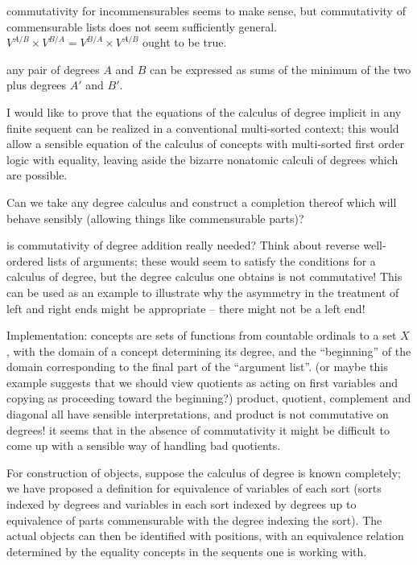 \documentclass{article}
\begin{document}
commutativity for incommensurables seems to make sense, but
commutativity of commensurable lists does not seem sufficiently
general.  $V^{A/B} \times V^{B/A} = V^{B/A}\times V^{A/B}$ ought to be
true.

any pair of degrees $A$ and $B$ can be expressed as sums of the
minimum of the two plus degrees $A'$ and $B'$.

I would like to prove that the equations of the calculus of degree
implicit in any finite sequent can be realized in a conventional
multi-sorted context; this would allow a sensible equation of the
calculus of concepts with multi-sorted first order logic with
equality, leaving aside the bizarre nonatomic calculi of degrees which
are possible.

Can we take any degree calculus and construct a completion thereof which 
will behave sensibly (allowing things like commensurable parts)?

is commutativity of degree addition really needed?  Think about reverse
well-ordered lists of arguments; these would seem to satisfy the 
conditions for a calculus of degree, but the degree calculus one
obtains is not commutative!  This can be used as an example to illustrate
why the asymmetry in the treatment of left and right ends might be
appropriate -- there might not be a left end!

Implementation:  concepts are sets of functions from countable
ordinals to a set $X$, with the domain of a concept determining its
degree, and the ``beginning'' of the domain corresponding to the
final part of the ``argument list''. (or maybe this example suggests
that we should view quotients as acting on first variables and copying
as proceeding toward the beginning?)  product, quotient, complement
and diagonal all have sensible interpretations, and product is not
commutative on degrees!  it seems that in the absence of commutativity
it might be difficult to come up with a sensible way of handling bad
quotients.

For construction of objects, suppose the calculus of degree is known
completely; we have proposed a definition for equivalence of variables
of each sort (sorts indexed by degrees and variables in each sort
indexed by degrees up to equivalence of parts commensurable with the
degree indexing the sort).  The actual objects can then be identified
with positions, with an equivalence relation determined by the equality
concepts in the sequents one is working with.
\end{document}
